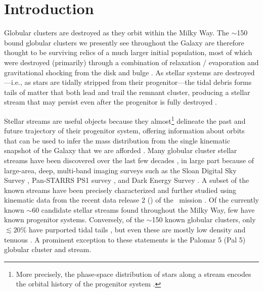 \documentclass[twocolumn]{aastex63}
\begin{document}
\section{Introduction} \label{sec:intro}

Globular clusters are destroyed as they orbit within the Milky Way.
The $\sim$150 bound globular clusters we presently see throughout the Galaxy \citep{Harris2010} are therefore thought to be surviving relics of a much larger initial population, most of which were destroyed (primarily) through a combination of relaxation / evaporation and gravitational shocking from the disk and bulge \citep[e.g.,][]{Gnedin:1997, Gnedin:2014}.
As stellar systems are destroyed---i.e., as stars are tidally stripped from their progenitor---the tidal debris forms tails of matter that both lead and trail the remnant cluster, producing a stellar stream that may persist even after the progenitor is fully destroyed \citep[e.g.,][]{Johnston:1996, Eyre:2011}.

Stellar streams are useful objects because they almost\footnote{More precisely, the phase-space distribution of stars along a stream encodes the orbital history of the progenitor system \citep[e.g.,][]{Sanders:2013}.} delineate the past and future trajectory of their progenitor system, offering information about orbits that can be used to infer the mass distribution from the single kinematic snapshot of the Galaxy that we are afforded \citep[e.g.,][]{Johnston:1999, Binney:2008, Eyre:2009, Sanders:2013, PriceWhelan:2014, Bonaca:2018}.
Many globular cluster stellar streams have been discovered over the last few decades \citep[see, e.g.,][]{Grillmair:2016, Shipp:2018}, in large part because of large-area, deep, multi-band imaging surveys such as the Sloan Digital Sky Survey \citep[SDSS;][]{York:2000}, Pan-STARRS PS1 survey \citep{Chambers:2016}, and Dark Energy Survey \citep{DES:2016}.
A subset of the known streams have been precisely characterized and further studied \citep[e.g.,][]{PriceWhelan:2018, Malhan:2018, Shipp:2019} using kinematic data from the recent data release 2 () of the \Gaia\ mission \citep{Gaia:2016, Gaia:2018}.
Of the currently known $\sim$60 candidate stellar streams found throughout the Milky Way, few have known progenitor systems.
Conversely, of the $\sim$150 known globular clusters, only $\lesssim 20\%$ have purported tidal tails \citep[e.g.,][]{Leon:2000, Kundu:2019}, but even these are mostly low density and tenuous \citep[as might be expected, e.g.,][]{Balbinot:2018}.
A prominent exception to these statements is the Palomar 5 (Pal 5) globular cluster and stream.
\end{document}

